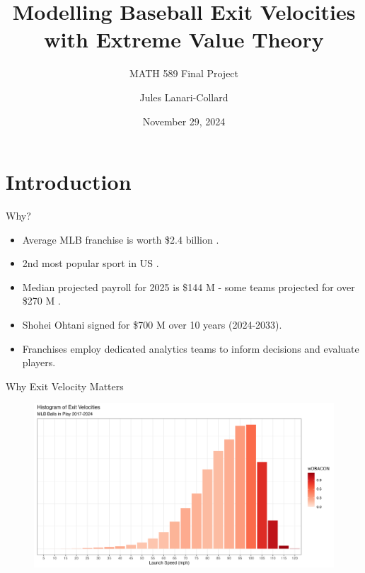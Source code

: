 \documentclass{beamer}
\title{Modelling Baseball Exit Velocities with Extreme Value Theory}
\subtitle{MATH 589 Final Project}
\author{Jules Lanari-Collard}
\institute{McGill University}
\date{November 29, 2024}
\begin{document}
\frame{\titlepage}
\section{Introduction}

\begin{frame}{Why?}
\begin{itemize}
    \item Average MLB franchise is worth \$2.4 billion \cite{forbesValuations}.
    \item 2nd most popular sport in US \cite{gallupPoll}.
    \item Median projected payroll for 2025 is \$144 M - some teams projected for over \$270 M \cite{fgRosterResource}.
    \item Shohei Ohtani signed for \$700 M over 10 years (2024-2033).
    \item Franchises employ dedicated analytics teams to inform decisions and evaluate players.
\end{itemize}
\end{frame}

\begin{frame}{Why Exit Velocity Matters}
    \begin{figure}
        \centering
        \includegraphics[width=\linewidth]{plots/evHistogram.png}
        \label{fig:evHistogram}
    \end{figure}
\end{frame}
\end{document}
